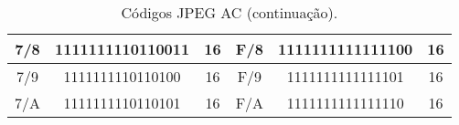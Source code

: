 \begin{table}[!ht]
\begin{tabular}{|c|c|c|c|c|c|}
7/8                                                        & 1111111110110011 & 16      & F/8                                                        & 1111111111111100 & 16      \\ \hline
7/9                                                        & 1111111110110100 & 16      & F/9                                                        & 1111111111111101 & 16      \\ \hline
7/A                                                        & 1111111110110101 & 16      & F/A                                                        & 1111111111111110 & 16      \\ \hline
\end{tabular}
\caption{Códigos JPEG AC (continuação).}
\label{Cod-AC3}
\end{table}